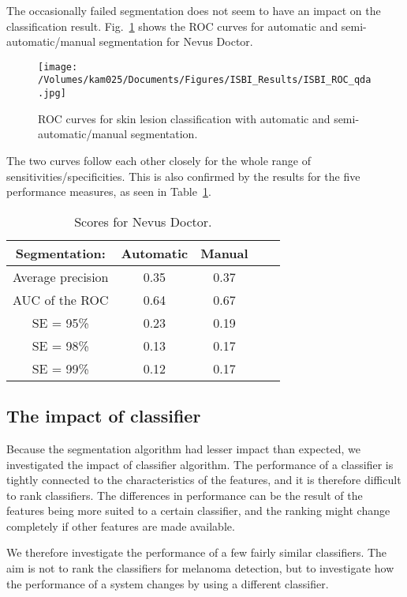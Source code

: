 \documentclass[a4paper,12pt]{article}
\begin{document}
The occasionally failed segmentation does not seem to have an impact on the classification result.
Fig.~\ref{fig:ROC} shows the ROC curves for automatic and semi-automatic/manual segmentation for Nevus Doctor. 
  \begin{figure}[h!]
     \texttt{[image: /Volumes/kam025/Documents/Figures/ISBI\_Results/ISBI\_ROC\_qda.jpg]}
      \caption{ROC curves for skin lesion classification with automatic and semi-automatic/manual segmentation.}
       \label{fig:ROC}
   \end{figure}
The two curves follow each other closely for the whole range of sensitivities/specificities. 
This is also confirmed by the results for the five performance measures, as seen in Table~\ref{tab:ND_Rankings}.    
\begin{table}[h!]
\begin{tabular}{c | c | c | c | c}
        Segmentation: &{Automatic} & {Manual} \\
        \hline
  Average precision & 0.35 & 0.37 \\
  AUC of the ROC & 0.64 & 0.67 \\
  SE = 95\% & 0.23 & 0.19 \\
  SE = 98\%  & 0.13 & 0.17 \\
  SE = 99\%  & 0.12  & 0.17
\end{tabular}
  \caption{Scores for Nevus Doctor.}
  \label{tab:ND_Rankings}
\end{table}

\subsection{The impact of classifier} 

Because the segmentation algorithm had lesser impact than expected, we investigated the impact of classifier algorithm.
The performance of a classifier is tightly connected to the characteristics of the features, and it is therefore difficult to rank classifiers.
The differences in performance can be the result of the features being more suited to a certain classifier, and the ranking might change completely if other features are made available. 

We therefore investigate the performance of a few fairly similar classifiers. 
The aim is not to rank the classifiers for melanoma detection, but to investigate how the performance of a system changes by using a different classifier. 
\end{document}
